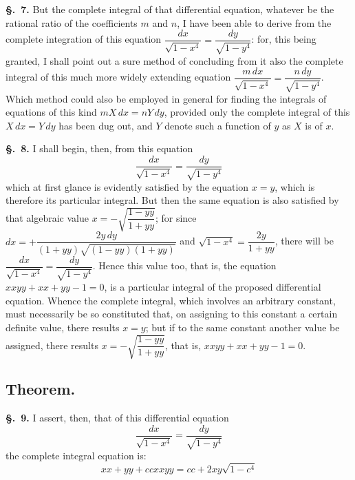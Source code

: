 \documentclass{article}
\begin{document}
\textbf{§.~7.} But the complete integral of that differential equation, whatever be the rational
ratio of the coefficients $m$ and $n$, I have been able to derive from the complete integration of
this equation $\dfrac{dx}{\sqrt{1-x^{4}}} = \dfrac{dy}{\sqrt{1-y^{4}}}$: for, this being granted, I
shall point out a sure method of concluding from it also the complete integral of this much more
widely extending equation
$\dfrac{m\,dx}{\sqrt{1-x^{4}}} = \dfrac{n\,dy}{\sqrt{1-y^{4}}}$. Which method could also be employed in
general for finding the integrals of equations of this kind $mX\,dx = nY\,dy$, provided only the
complete integral of this $X\,dx = Y\,dy$ has been dug out, and $Y$ denote such a function of $y$ as
$X$ is of $x$.

\textbf{§.~8.} I shall begin, then, from this equation
\[ \frac{dx}{\sqrt{1-x^{4}}} = \frac{dy}{\sqrt{1-y^{4}}} \]
which at first glance is evidently satisfied by the equation $x = y$, which is therefore its
particular integral. But then the same equation is also satisfied by that algebraic value
$x = -\sqrt{\dfrac{1-yy}{1+yy}}$; for since
$dx = +\dfrac{2y\,dy}{(1+yy)\sqrt{(1-yy)(1+yy)}}$ and $\sqrt{1-x^{4}} = \dfrac{2y}{1+yy}$, there will
be $\dfrac{dx}{\sqrt{1-x^{4}}} = \dfrac{dy}{\sqrt{1-y^{4}}}$. Hence this value too, that is, the
equation $xxyy + xx + yy - 1 = 0$, is a particular integral of the proposed differential equation.
Whence the complete integral, which involves an arbitrary constant, must necessarily be so
constituted that, on assigning to this constant a certain definite value, there results $x = y$; but
if to the same constant another value be assigned, there results
$x = -\sqrt{\dfrac{1-yy}{1+yy}}$, that is, $xxyy + xx + yy - 1 = 0$.

\subsection*{Theorem.}
\textbf{§.~9.} I assert, then, that of this differential equation
\[ \frac{dx}{\sqrt{1-x^{4}}} = \frac{dy}{\sqrt{1-y^{4}}} \]
the complete integral equation is:
\[ xx + yy + ccxxyy = cc + 2xy\sqrt{1-c^{4}} \]
\end{document}

